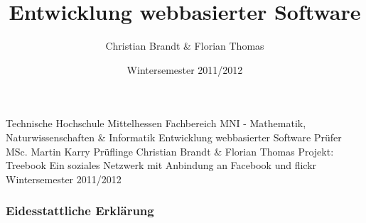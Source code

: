 \documentclass[10pt,a4paper]{book}
\author{Christian Brandt & Florian Thomas}
\title{Entwicklung webbasierter Software}
\date{Wintersemester 2011/2012}
\begin{document}
\begin{titlepage}
\begin{center}
\LARGE{Technische Hochschule Mittelhessen}
\linebreak
\large{Fachbereich MNI - Mathematik, Naturwissenschaften \& Informatik}
\linebreak 
\linebreak
\linebreak
\linebreak
\linebreak
\linebreak
\linebreak
\LARGE{Entwicklung webbasierter Software}
\linebreak
\linebreak
\linebreak
\linebreak
\linebreak
\linebreak
\linebreak
\large{Prüfer}
\linebreak
\large{MSc. Martin Karry}
\linebreak
\linebreak
\large{Prüflinge}
\linebreak
\large{Christian Brandt \& Florian Thomas}
\linebreak
\linebreak
\linebreak
\linebreak
\Large{Projekt: Treebook}
\linebreak
\normalsize{Ein soziales Netzwerk mit Anbindung an Facebook und flickr}
\linebreak
\linebreak
\linebreak
\linebreak
\linebreak
\linebreak
\normalsize{Wintersemester 2011/2012}
\end{center}
\end{titlepage}
\setcounter{page}{1}
\subsubsection{Eidesstattliche Erklärung}

\tableofcontents
\renewcommand{\chaptername}{}
\renewcommand{\thechapter}{}
\renewcommand{\thesection}{\arabic{section}}
\renewcommand{\thefigure}{\arabic{figure}}
\end{document}
